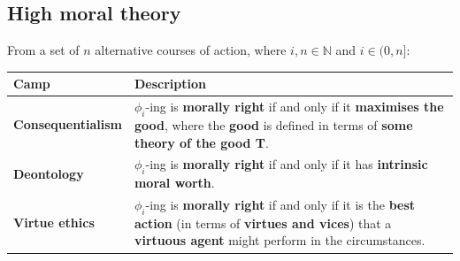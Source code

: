 \documentclass[11pt]{article}
\begin{document}
\subsection{High moral theory}
\label{sec:orgef737d6}
From a set of \(n\) alternative courses of action, where \(i, n \in \mathbb{N}\) and \(i \in (0, n]\):
\begin{center}
\begin{tabularx}{\textwidth}{|X|X|}
\hline
Camp & Description\\
\hline
\textbf{Consequentialism} & \(\phi_i\)-ing is \textbf{morally right} if and only if it \textbf{maximises the good}, where the \textbf{good} is defined in terms of \textbf{some theory of the good T}.\\
\hline
\textbf{Deontology} & \(\phi_i\)-ing is \textbf{morally right} if and only if it has \textbf{intrinsic moral worth}.\\
\hline
\textbf{Virtue ethics} & \(\phi_i\)-ing is \textbf{morally right} if and only if it is the \textbf{best action} (in terms of \textbf{virtues and vices}) that a \textbf{virtuous agent} might perform in the circumstances.\\
\hline
\end{tabularx}
\end{center}
 \newpage
\end{document}
